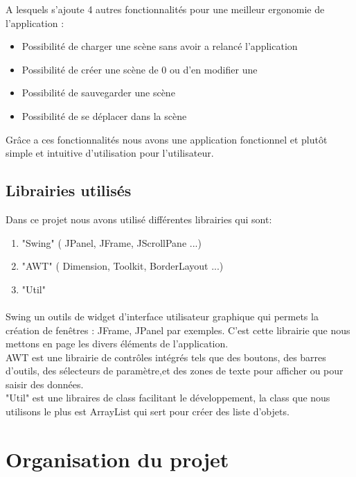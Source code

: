 \documentclass[12pt]{article}
\begin{document}
        A lesquels s'ajoute 4 autres fonctionnalités pour une meilleur ergonomie de l'application :
        
            \begin{itemize}
                \item Possibilité de charger une scène sans avoir a relancé l'application
                \item Possibilité de créer une scène de 0 ou d'en modifier une
                \item Possibilité de sauvegarder une scène
                \item Possibilité de se déplacer dans la scène
            \end{itemize}
            
        Grâce a ces fonctionnalités nous avons une application fonctionnel et plutôt simple et intuitive d'utilisation pour l'utilisateur.
        \subsection{Librairies utilisés}
            Dans ce projet nous avons utilisé différentes librairies qui sont: 
            
                \begin{enumerate}
                    \item "Swing" ( JPanel, JFrame, JScrollPane ...)
                    \item "AWT" ( Dimension, Toolkit, BorderLayout ...)
                    \item "Util"
                \end{enumerate}
        \paragraph{}
        Swing un outils de widget d'interface utilisateur graphique qui permets la création de fenêtres : JFrame, JPanel par exemples. C'est cette librairie que nous mettons en page les divers éléments de l'application.\\
        AWT est une librairie de contrôles intégrés tels que des boutons, des barres d'outils, des sélecteurs de paramètre,et des zones de texte pour afficher ou pour saisir des données.\\
        "Util" est une libraires de class facilitant le développement, la class que nous utilisons le plus est ArrayList qui sert pour créer des liste d'objets.
        		
\section{Organisation du projet}
\end{document}
